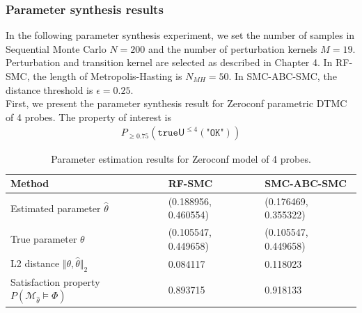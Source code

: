 \subsubsection{Parameter synthesis results}
In the following parameter synthesis experiment, we set the number of samples in Sequential Monte
Carlo $N=200$ and the number of perturbation kernels $M=19$. Perturbation and transition kernel are
selected as described in Chapter 4. In RF-SMC, the length of Metropolis-Hasting is $N_{MH}=50$. In
SMC-ABC-SMC, the distance threshold is $\epsilon=0.25$.\\
First, we present the parameter synthesis result for Zeroconf parametric DTMC of 4 probes. The
property of interest is
\begin{align*}
    P_{\geq 0.75} (\texttt{true} \mathsf{U}^{\leq 4} (\texttt{"OK"}))
\end{align*}
\begin{table}[H]
    \begin{tabular}{|l|l|l|}
        \hline
        Method                                                           & RF-SMC               & SMC-ABC-SMC          \\ \hline
        Estimated parameter $\hat{\theta}$                               & (0.188956, 0.460554) & (0.176469, 0.355322) \\ \hline
        True parameter $\theta$                                          & (0.105547, 0.449658) & (0.105547, 0.449658) \\ \hline
        L2 distance $\Vert \theta, \hat{\theta} \Vert_2$                 & 0.084117             & 0.118023             \\ \hline
        Satisfaction property $P(\mathcal{M}_{\hat{\theta}}\models\Phi)$ & 0.893715             & 0.918133             \\ \hline
    \end{tabular}
    \caption{Parameter estimation results for Zeroconf model of 4 probes.}
\end{table}

